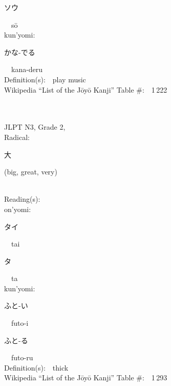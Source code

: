 \begin{multicols}{2}
{\hspace*{2em}}{\begin{CJK}{UTF8}{min} ソウ \end{CJK}}\ \ s\=o\ \ \\
{\hspace*{1em}}kun'yomi:\ \ \\
{\hspace*{2em}}{\begin{CJK}{UTF8}{min} かな-でる \end{CJK}}\ \ kana-deru\ \ \\
Definition(s):\ \ play music \\
Wikipedia ``List of the J\=oy\=o Kanji'' Table \#:\ \ 1\,222 \\
\ \ \\
{\fontsize{34pt}{40pt}  }\ \ \\  %
{JLPT N3, Grade 2, \\Radical:\ \ {\begin{CJK}{UTF8}{min} 大 \end{CJK}} (big, great, very) } \\
Reading(s):\ \ \\
{\hspace*{1em}}on'yomi:\ \ \\
{\hspace*{2em}}{\begin{CJK}{UTF8}{min} タイ \end{CJK}}\ \ tai\ \ \\
{\hspace*{2em}}{\begin{CJK}{UTF8}{min} タ \end{CJK}}\ \ ta\ \ \\
{\hspace*{1em}}kun'yomi:\ \ \\
{\hspace*{2em}}{\begin{CJK}{UTF8}{min} ふと-い \end{CJK}}\ \ futo-i\ \ \\
{\hspace*{2em}}{\begin{CJK}{UTF8}{min} ふと-る \end{CJK}}\ \ futo-ru\ \ \\
Definition(s):\ \ thick \\
Wikipedia ``List of the J\=oy\=o Kanji'' Table \#:\ \ 1\,293 \\

\end{multicols}

